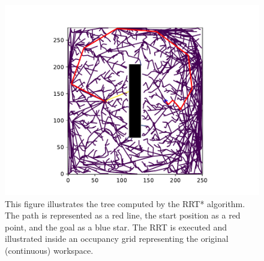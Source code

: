 \begin{figure}[H]
    \centering
    \includegraphics[width=0.7\linewidth]{figures//Simulations//sim_rrt/rrt_res.pdf}
    \caption{This figure illustrates the tree computed by the RRT* algorithm. The path is represented as a red line, the start position as a red point, and the goal as a blue star. The RRT is executed and illustrated inside an occupancy grid representing the original (continuous) workspace.}
    \label{fig:enter-label}
\end{figure}

